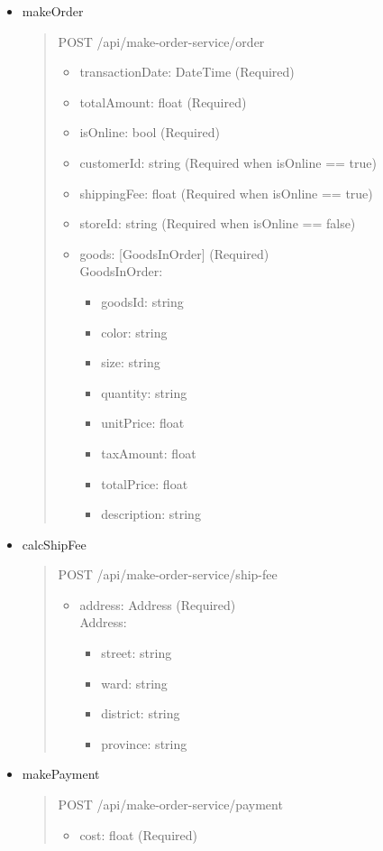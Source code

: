\begin{itemize}
	\item makeOrder
	      \begin{quote}
		      POST /api/make-order-service/order
		      \begin{itemize}
			      \item transactionDate: DateTime (Required)
			      \item totalAmount: float (Required)
			      \item isOnline: bool (Required)
			      \item customerId: string (Required when isOnline == true)
			      \item shippingFee: float (Required when isOnline == true)
			      \item storeId: string (Required when isOnline == false)
			      \item goods: [GoodsInOrder] (Required)\\
							GoodsInOrder:
							\begin{itemize}
								\item goodsId: string 
								\item color: string 
								\item size: string 
								\item quantity: string 
								\item unitPrice: float 
								\item taxAmount: float 
								\item totalPrice: float 
								\item description: string
							\end{itemize}
		      \end{itemize}
	      \end{quote}
	\item calcShipFee
	      \begin{quote}
		      POST /api/make-order-service/ship-fee
		      \begin{itemize}
			      \item address: Address (Required)\\
							Address:
							\begin{itemize}
								\item street: string 
								\item ward: string
								\item district: string
								\item province: string
							\end{itemize}
		      \end{itemize}
	      \end{quote}
	\item makePayment
	      \begin{quote}
		      POST /api/make-order-service/payment
		      \begin{itemize}
			      \item cost: float (Required)
		      \end{itemize}
	      \end{quote}			
\end{itemize}

